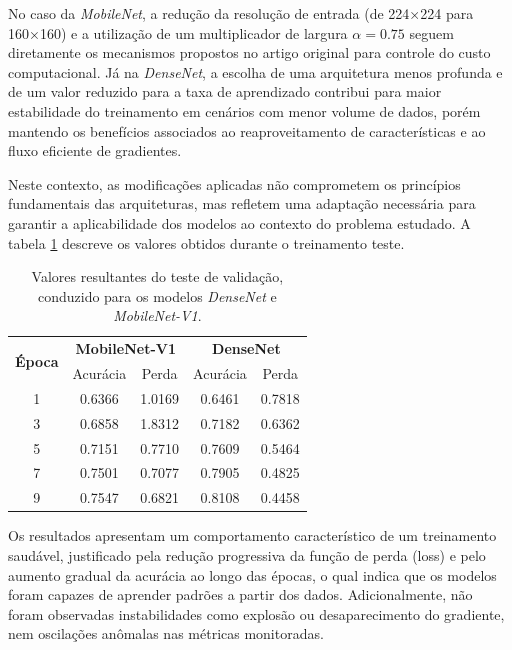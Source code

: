 No caso da \textit{MobileNet}, a redução da resolução de entrada (de 224×224 para 160×160) e a utilização de um multiplicador de largura $\alpha = 0.75$ seguem diretamente os mecanismos propostos no artigo original para controle do custo computacional. Já na \textit{DenseNet}, a escolha de uma arquitetura menos profunda e de um valor reduzido para a taxa de aprendizado contribui para maior estabilidade do treinamento em cenários com menor volume de dados, porém mantendo os benefícios associados ao reaproveitamento de características e ao fluxo eficiente de gradientes.

Neste contexto, as modificações aplicadas não comprometem os princípios fundamentais das arquiteturas, mas refletem uma adaptação necessária para garantir a aplicabilidade dos modelos ao contexto do problema estudado. A tabela \ref{tab:mobile_dense_sanity} descreve os valores obtidos durante o treinamento teste.

\begin{table}[H]
	\centering
	\caption{Valores resultantes do teste de validação, conduzido para os modelos \textit{DenseNet} e \textit{MobileNet-V1}.}
	
	\begin{tabular}{c|cc|cc}
		
		\toprule
		\multirow{2}{*}{\textbf{Época}} 
		
		& \multicolumn{2}{c|}{\textbf{MobileNet-V1}} 
		& \multicolumn{2}{c}{\textbf{DenseNet}} \\
		
		& Acurácia & Perda & Acurácia & Perda\\
		\midrule
		1  & 0.6366 & 1.0169 & 0.6461 & 0.7818 \\
		3  & 0.6858 & 1.8312 & 0.7182 & 0.6362 \\
		5  & 0.7151 & 0.7710 & 0.7609 & 0.5464 \\
		7  & 0.7501 & 0.7077 & 0.7905 & 0.4825 \\
		9  & 0.7547 & 0.6821 & 0.8108 & 0.4458 \\
		\bottomrule
	\end{tabular}
	\label{tab:mobile_dense_sanity}
\end{table}

Os resultados apresentam um comportamento característico de um treinamento saudável, justificado pela redução progressiva da função de perda (loss) e pelo aumento gradual da acurácia ao longo das
épocas, o qual indica que os modelos foram capazes de aprender padrões a partir dos dados. Adicionalmente, não foram observadas instabilidades como explosão ou desaparecimento do gradiente, nem oscilações anômalas nas métricas monitoradas.

